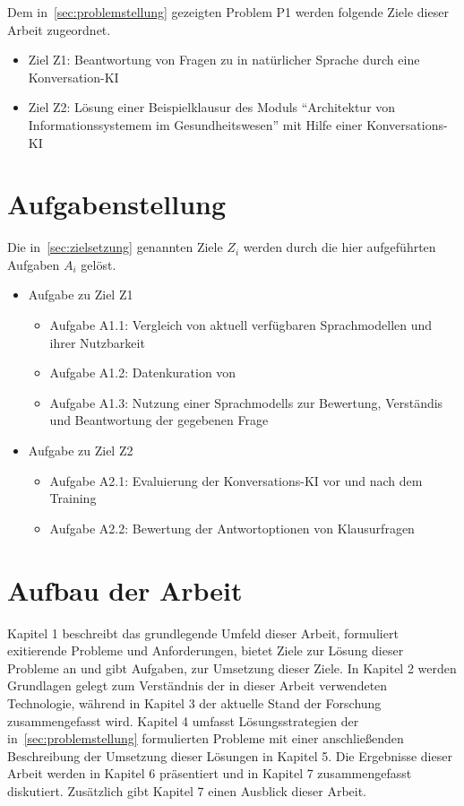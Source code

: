 Dem in~\ref{sec:problemstellung} gezeigten Problem P1 werden folgende Ziele dieser Arbeit zugeordnet.
\begin{itemize}
  \item Ziel Z1: Beantwortung von Fragen zu \citet{bb} in natürlicher Sprache durch eine Konversation-KI
  \item Ziel Z2: Lösung einer Beispielklausur des Moduls \enquote{Architektur von Informationssystemem im Gesundheitswesen} mit Hilfe einer Konversations-KI
\end{itemize}

\section{Aufgabenstellung}

Die in~\ref{sec:zielsetzung} genannten Ziele $Z_i$ werden durch die hier aufgeführten Aufgaben $A_i$ gelöst.

\begin{itemize}
  \item Aufgabe zu Ziel Z1
  \begin{itemize}
    \item Aufgabe A1.1: Vergleich von aktuell verfügbaren Sprachmodellen und ihrer Nutzbarkeit
    \item Aufgabe A1.2: Datenkuration von \citet{bb}
    \item Aufgabe A1.3: Nutzung einer Sprachmodells zur Bewertung, Verständis und Beantwortung der gegebenen Frage
  \end{itemize}
  \item Aufgabe zu Ziel Z2
  \begin{itemize}
    \item Aufgabe A2.1: Evaluierung der Konversations-KI vor und nach dem Training
    \item Aufgabe A2.2: Bewertung der Antwortoptionen von Klausurfragen
  \end{itemize}
\end{itemize}

\section{Aufbau der Arbeit}
Kapitel 1 beschreibt das grundlegende Umfeld dieser Arbeit, formuliert exitierende Probleme und Anforderungen, bietet Ziele zur Lösung dieser Probleme an und gibt Aufgaben, zur Umsetzung dieser Ziele. 
In Kapitel 2 werden Grundlagen gelegt zum Verständnis der in dieser Arbeit verwendeten Technologie, während in Kapitel 3 der aktuelle Stand der Forschung zusammengefasst wird. 
Kapitel 4 umfasst Lösungsstrategien der in~\ref{sec:problemstellung} formulierten Probleme mit einer anschließenden Beschreibung der Umsetzung dieser Lösungen in Kapitel 5. 
Die Ergebnisse dieser Arbeit werden in Kapitel 6 präsentiert und in Kapitel 7 zusammengefasst diskutiert. 
Zusätzlich gibt Kapitel 7 einen Ausblick dieser Arbeit.
